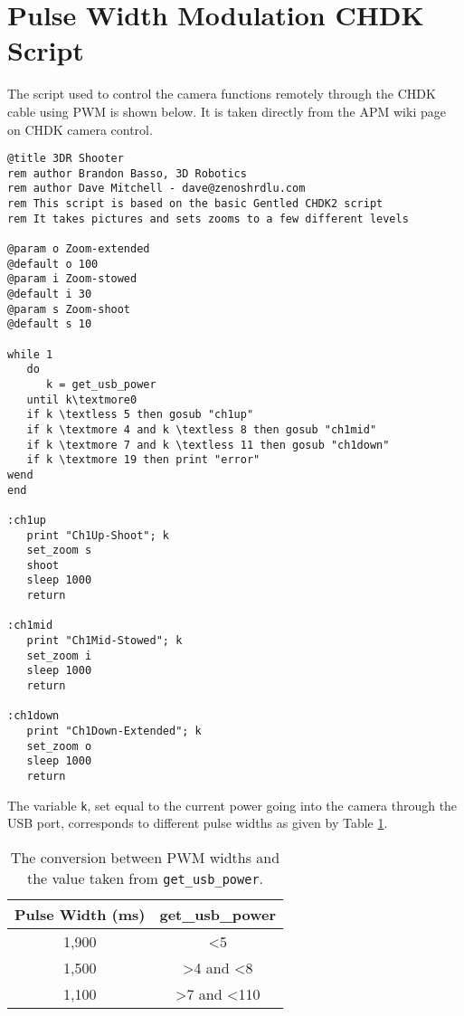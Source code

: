 \section{Pulse Width Modulation CHDK Script}
\label{app:pwm}

The script used to control the camera functions remotely through the CHDK cable
using PWM is shown below. It is taken directly from the APM wiki page on CHDK
camera
control.

\begin{verbatim}
@title 3DR Shooter
rem author Brandon Basso, 3D Robotics
rem author Dave Mitchell - dave@zenoshrdlu.com
rem This script is based on the basic Gentled CHDK2 script
rem It takes pictures and sets zooms to a few different levels

@param o Zoom-extended
@default o 100
@param i Zoom-stowed
@default i 30
@param s Zoom-shoot
@default s 10

while 1
   do
      k = get_usb_power
   until k\textmore0
   if k \textless 5 then gosub "ch1up" 
   if k \textmore 4 and k \textless 8 then gosub "ch1mid" 
   if k \textmore 7 and k \textless 11 then gosub "ch1down" 
   if k \textmore 19 then print "error"
wend
end

:ch1up
   print "Ch1Up-Shoot"; k
   set_zoom s
   shoot
   sleep 1000
   return

:ch1mid
   print "Ch1Mid-Stowed"; k
   set_zoom i
   sleep 1000
   return

:ch1down
   print "Ch1Down-Extended"; k
   set_zoom o
   sleep 1000
   return
\end{verbatim}

The variable \texttt{k}, set equal to the current power going into the camera
through the USB port, corresponds to different pulse widths as given by Table
\ref{tab:pwm}.

\begin{table}
    \begin{center}
        \begin{tabular}{| c | c |}
            \hline
            \textbf{Pulse Width (ms)} & \textbf{get\_usb\_power} \\
            \hline
            1,900 & \textless 5 \\
            1,500 & \textgreater 4 and \textless 8 \\
            1,100 & \textgreater 7 and \textless 110 \\
            \hline
        \end{tabular}
        \caption{The conversion between PWM widths and the value taken from
        \texttt{get\_usb\_power}.}
        \label{tab:pwm}
    \end{center}
\end{table}

